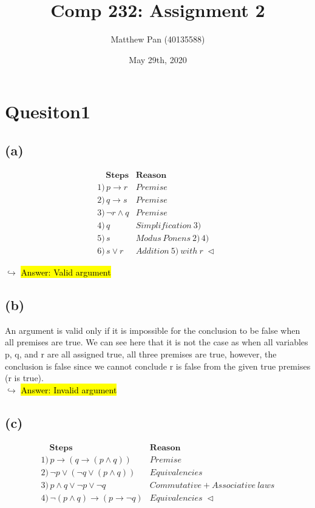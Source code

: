 \documentclass[a4paper, 12pt]{article}
\title{Comp 232: Assignment 2}
\author{Matthew Pan (40135588)}
\date{May 29th, 2020}
\begin{document}
	\pagecolor{white}
	\maketitle
	\setlength{\parindent}{0pt}
	
\section*{Quesiton1}

\subsection*{(a)}

\[\begin{array}{lll}%
\quad \textbf{Steps}  &  \textbf{Reason}\\
1)\, p \rightarrow r  & Premise\\ 
2)\, q \rightarrow s  & Premise\\
3)\, \lnot r \land q  & Premise\\
4)\, q & Simplification \: 3)\\
5)\, s & Modus \,Ponens \: 2) \, 4)\\
6)\, s \lor r & Addition \: 5)\: with\: r \; \lhd\
\end{array}\]

$\hookrightarrow$ \hl{Answer: Valid argument}

\subsection*{(b)}

An argument is valid only if it is impossible for the conclusion to be false when all premises are true. We can see here that it is not the case as when all variables p, q, and r are all assigned true, all three premises are true, however, the conclusion is false since we cannot conclude r is false from the given true premises (r is true).\\

$\hookrightarrow$ \hl{Answer: Invalid argument}

\subsection*{(c)}

\[\begin{array}{lll}%
\quad \textbf{Steps}  &  \textbf{Reason}\\
1)\, p \rightarrow (q \rightarrow (p \land q)) & Premise\\ 
2)\, \lnot p \lor ( \lnot q \lor ( p \land q))  & Equivalencies\\
3)\, p \land q \lor  \lnot p \lor \lnot q & Commutative + Associative \: laws\\
4)\, \lnot (p \land q ) \rightarrow ( p \rightarrow \lnot q) & Equivalencies \; \lhd\\
\end{array}\]
\end{document}

